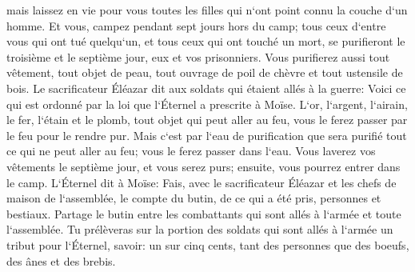 \verse mais laissez en vie pour vous toutes les filles qui n`ont point connu la couche d`un homme. 
\verse Et vous, campez pendant sept jours hors du camp; tous ceux d`entre vous qui ont tué quelqu`un, et tous ceux qui ont touché un mort, se purifieront le troisième et le septième jour, eux et vos prisonniers. 
\verse Vous purifierez aussi tout vêtement, tout objet de peau, tout ouvrage de poil de chèvre et tout ustensile de bois. 
\verse Le sacrificateur Éléazar dit aux soldats qui étaient allés à la guerre: Voici ce qui est ordonné par la loi que l`Éternel a prescrite à Moïse. 
\verse L`or, l`argent, l`airain, le fer, l`étain et le plomb, 
\verse tout objet qui peut aller au feu, vous le ferez passer par le feu pour le rendre pur. Mais c`est par l`eau de purification que sera purifié tout ce qui ne peut aller au feu; vous le ferez passer dans l`eau. 
\verse Vous laverez vos vêtements le septième jour, et vous serez purs; ensuite, vous pourrez entrer dans le camp. 
\verse L`Éternel dit à Moïse: 
\verse Fais, avec le sacrificateur Éléazar et les chefs de maison de l`assemblée, le compte du butin, de ce qui a été pris, personnes et bestiaux. 
\verse Partage le butin entre les combattants qui sont allés à l`armée et toute l`assemblée. 
\verse Tu prélèveras sur la portion des soldats qui sont allés à l`armée un tribut pour l`Éternel, savoir: un sur cinq cents, tant des personnes que des boeufs, des ânes et des brebis. 
